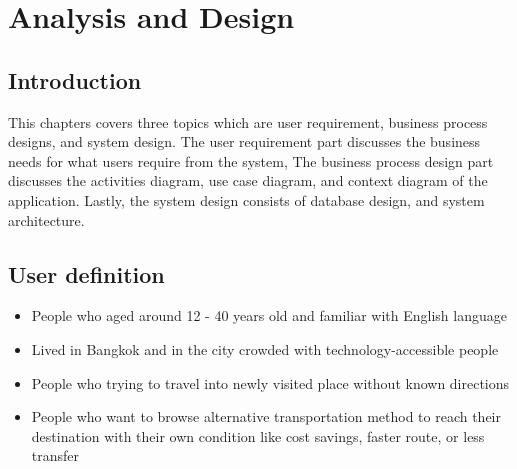 \chapter{Analysis and Design}
\section{Introduction}
\par
This chapters covers three topics which are user requirement, business process designs, and system design. The user requirement part discusses the business needs for what users require from the system, The business process design part discusses the activities diagram, use case diagram, and context diagram of the application. Lastly, the system design consists of database design, and system architecture.

\section{User definition}
\begin{itemize}
    \item People who aged around 12 - 40 years old and familiar with English language
    \item Lived in Bangkok and in the city crowded with technology-accessible people
    \item People who trying to travel into newly visited place without known directions
    \item People who want to browse alternative transportation method to reach their destination with their own condition like cost savings, faster route, or less transfer
\end{itemize}
